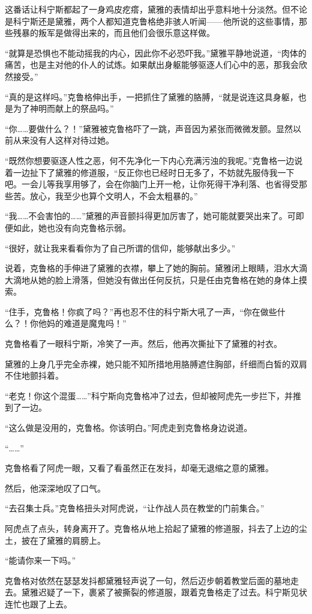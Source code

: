 这番话让科宁斯都起了一身鸡皮疙瘩，黛雅的表情却出乎意料地十分淡然。但不论是科宁斯还是黛雅，两个人都知道克鲁格绝非骇人听闻——他所说的这些事情，那些残暴的叛军是做得出来的，而且他们会很乐意这样做。

“就算是恐惧也不能动摇我的内心，因此你不必恐吓我。”黛雅平静地说道，“肉体的痛苦，也是主对他的仆人的试炼。如果献出身躯能够驱逐人们心中的恶，那我会欣然接受。”

“真的是这样吗。”克鲁格伸出手，一把抓住了黛雅的胳膊，“就是说连这具身躯，也是为了神明而献上的祭品吗。”

“你……要做什么？！”黛雅被克鲁格吓了一跳，声音因为紧张而微微发颤。显然以前从来没有人这样对待过她。

“既然你想要驱逐人性之恶，何不先净化一下内心充满污浊的我呢。”克鲁格一边说着一边扯下了黛雅的修道服，“反正你也已经时日无多了，不妨就先服侍我一下吧。一会儿等我享用够了，会在你脑门上开一枪，让你死得干净利落、也省得受那些苦。放心，我至少也算个文明人，不会太粗暴的。”

“我……不会害怕的……”黛雅的声音颤抖得更加厉害了，她可能就要哭出来了。可即便如此，她也没有向克鲁格示弱。

“很好，就让我来看看你为了自己所谓的信仰，能够献出多少。”

说着，克鲁格的手伸进了黛雅的衣襟，攀上了她的胸前。黛雅闭上眼睛，泪水大滴大滴地从她的脸上滑落，但她没有做出任何反抗，只是任由克鲁格在她的身体上摸索。

“住手，克鲁格！你疯了吗？”再也忍不住的科宁斯大吼了一声，“你在做些什么？！你他妈的难道是魔鬼吗！”

克鲁格看了一眼科宁斯，冷笑了一声。然后，他再次撕扯下了黛雅的衬衣。

黛雅的上身几乎完全赤裸，她只能不知所措地用胳膊遮住胸部，纤细而白皙的双肩不住地颤抖着。

“老克！你这个混蛋……”科宁斯向克鲁格冲了过去，但却被阿虎先一步拦下，并推到了一边。

“这么做是没用的，克鲁格。你该明白。”阿虎走到克鲁格身边说道。

“……”

克鲁格看了阿虎一眼，又看了看虽然正在发抖，却毫无退缩之意的黛雅。

然后，他深深地叹了口气。

“去召集士兵。”克鲁格扭头对阿虎说，“让作战人员在教堂的门前集合。”

阿虎点了点头，转身离开了。克鲁格从地上拾起了黛雅的修道服，抖去了上边的尘土，披在了黛雅的肩膀上。

“能请你来一下吗。”

克鲁格对依然在瑟瑟发抖都黛雅轻声说了一句，然后迈步朝着教堂后面的墓地走去。黛雅迟疑了一下，裹紧了被撕裂的修道服，跟着克鲁格走了过去。科宁斯见状连忙也跟了上去。

